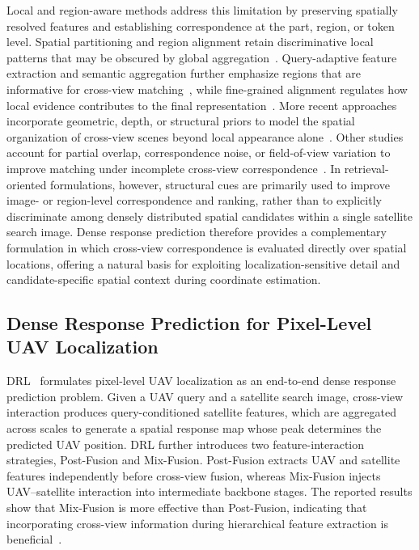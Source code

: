 \documentclass[runningheads]{llncs}
\begin{document}
Local and region-aware methods address this limitation by preserving spatially resolved features and establishing correspondence at the part, region, or token level. Spatial partitioning and region alignment retain discriminative local patterns that may be obscured by global aggregation~\cite{wang2022lpn,dai2022fsra}. Query-adaptive feature extraction and semantic aggregation further emphasize regions that are informative for cross-view matching~\cite{hu2025query,li2023asa,liu2024agel}, while fine-grained alignment regulates how local evidence contributes to the final representation~\cite{du2026fall,yan2026dfsa}. More recent approaches incorporate geometric, depth, or structural priors to model the spatial organization of cross-view scenes beyond local appearance alone~\cite{liu2026surfnet,sun2026depthgeoloc,zhang2026geo2}. Other studies account for partial overlap, correspondence noise, or field-of-view variation to improve matching under incomplete cross-view correspondence~\cite{ji2025game4loc,li2026paul,chen2026singeo}. In retrieval-oriented formulations, however, structural cues are primarily used to improve image- or region-level correspondence and ranking, rather than to explicitly discriminate among densely distributed spatial candidates within a single satellite search image. Dense response prediction therefore provides a complementary formulation in which cross-view correspondence is evaluated directly over spatial locations, offering a natural basis for exploiting localization-sensitive detail and candidate-specific spatial context during coordinate estimation.

\subsection{Dense Response Prediction for Pixel-Level UAV Localization}

DRL~\cite{dai2026drl} formulates pixel-level UAV localization as an end-to-end dense response prediction problem. Given a UAV query and a satellite search image, cross-view interaction produces query-conditioned satellite features, which are aggregated across scales to generate a spatial response map whose peak determines the predicted UAV position. DRL further introduces two feature-interaction strategies, Post-Fusion and Mix-Fusion. Post-Fusion extracts UAV and satellite features independently before cross-view fusion, whereas Mix-Fusion injects UAV--satellite interaction into intermediate backbone stages. The reported results show that Mix-Fusion is more effective than Post-Fusion, indicating that incorporating cross-view information during hierarchical feature extraction is beneficial~\cite{dai2026drl}.
\end{document}
